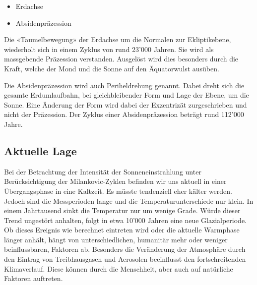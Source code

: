 \begin{itemize}
\item
Erdachse
\item
Absidenpräzession
\end{itemize}

Die «Taumelbewegung» der Erdachse um die Normalen zur Ekliptikebene,  wiederholt sich in einem Zyklus von rund 23'000 Jahren.
Sie wird als massgebende Präzession verstanden.
Ausgelöst wird dies besonders durch die Kraft, welche der Mond und die Sonne auf den Äquatorwulst ausüben.

Die Absidenpräzession wird auch Periheldrehung genannt.
Dabei dreht sich die gesamte Erdumlaufbahn, bei gleichbleibender Form und Lage der Ebene, um die Sonne. Eine Änderung der Form wird dabei der Exzentrizät zurgeschrieben und nicht der Präzession.
Der Zyklus einer Absidenpräzession beträgt rund 112'000 Jahre.

\subsection{Aktuelle Lage
\label{milankovic:subsection:Aktuelle Lage}}
Bei der Betrachtung der Intensität der Sonneneinstrahlung unter Berücksichtigung der Milankovic-Zyklen befinden wir uns aktuell in einer Übergangsphase in eine Kaltzeit.
Es müsste tendenziell eher kälter werden.
Jedoch sind die Messperioden lange und die Temperaturunterschiede nur klein.
In einem Jahrtausend sinkt die Temperatur nur um wenige Grade.
Würde dieser Trend ungestört anhalten, folgt in etwa 10'000 Jahren eine neue Glazialperiode.
Ob dieses Ereignis wie berechnet eintreten wird oder die aktuelle Warmphase länger anhält, hängt von unterschiedlichen, humanitär mehr oder weniger beinflussbaren, Faktoren ab. Besonders die Veränderung der Atmosphäre durch den Eintrag von Treibhausgasen und Aerosolen beeinflusst den fortschreitenden Klimaverlauf.
Diese können durch die Menschheit, aber auch auf natürliche Faktoren auftreten.

